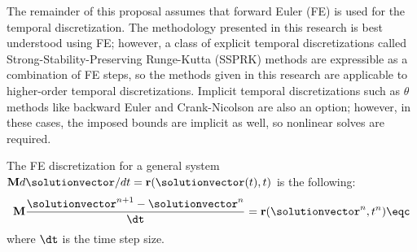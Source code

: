 The remainder of this proposal assumes that forward Euler (FE) is used for the
temporal discretization. The methodology presented in this research is best
understood using FE; however, a class of explicit temporal discretizations
called Strong-Stability-Preserving Runge-Kutta (SSPRK) methods are expressible
as a combination of FE steps, so the methods given in this research are
applicable to higher-order temporal discretizations.
Implicit temporal discretizations such as $\theta$ methods like backward
Euler and Crank-Nicolson are also an option; however, in these cases, the
imposed bounds are implicit as well, so nonlinear solves are required.

The FE discretization for a general system $\mathbf{M}d\solutionvector/dt=
\mathbf{r}(\solutionvector(t),t)$ is the following:
\begin{equation}
  \mathbf{M}\frac{\solutionvector^{n+1}-\solutionvector^n}{\dt} =
    \mathbf{r}(\solutionvector^n,t^n) \eqc
\end{equation}
where $\dt$ is the time step size.
